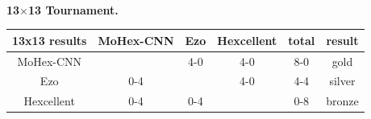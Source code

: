 \documentclass{icga}
\def\Eo{\mbox{\sc Ezo}}
\def\Hent{\mbox{\sc Hexcellent}}
\def\Mx{\mbox{\sc MoHex}}
\def\Mc{\mbox{\sc MoHex-CNN}}
\begin{document}

~

{\large\bf 13$\times$13 Tournament.}

\hfill\begin{tabular}{|c|c|c|c|c|c|}
\hline 13x13 results &\Mc{} &\Eo{}  &\Hent{} & total & result \\ 
\hline \Mc{}         &      &  4-0  & 4-0  & 8-0   & gold \\
\hline \Eo{}         &  0-4 &       & 4-0  & 4-4   & silver \\
\hline \Hent{}         &  0-4 &  0-4  &      & 0-8   & bronze \\
\hline
\end{tabular}\hfill~

%
%
%
%
%
%
%
%
%
%
%

\end{document}
